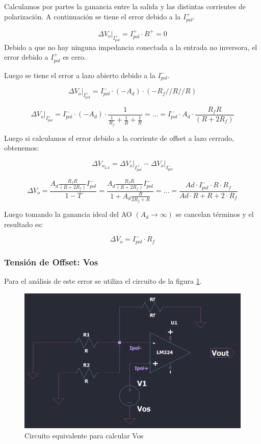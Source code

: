 \vspace{1em}
Calculamos por partes la ganancia entre la salida y las distintas corrientes de polarización. A continuación se tiene el error debido a la $I_{pol}^{+}$.

\[
\left.\Delta V_{o} \right|_{I_{p o l}^{+}}= I_{p o l}^{+} \cdot R^{+} = 0
\]
Debido a que no hay ninguna impedancia conectada a la entrada no inversora, el error debido a  $I_{pol}^{+}$ es cero.

\vspace{1em}

Luego se tiene el error a lazo abierto debido a la $I_{pol}^{-}$.
 
\[
\left.\Delta V_{o} \right|_{I_{pol}^{+}} = I_{pol}^{-} \cdot (-A_d) \cdot (-R_f // R // R)
\] 

\[\left.\Delta V_{o} \right|_{I_{pol}^{+}} 
= I_{pol}^{-} \cdot (-A_d) \cdot \frac{1}{\frac{1}{R_f}+\frac{1}{R}+\frac{1}{R}} 
= ... = I_{pol}^{-} \cdot A_d \cdot \frac{R_f R}{(R+2 R_f)} \] 
 
Luego si calculamos el error debido a la corriente de offset a lazo cerrado, obtenemos:

 \[ \Delta V_{o_{LA}} = \left.\Delta V_{o} \right|_{I_{pol}^{+}} - \left.\Delta V_{o} \right|_{I_{pol}^{-}}  \] 



\[
\Delta V_{o}= \frac{A_d \frac{R_f R}{(R+2 R_f)} I_{pol}^{-}}{1 - T} 
= \frac{A_d \frac{R_f R}{(R+2 R_f)} I_{pol}^{-}}{1 + A_d \frac{R}{2 R_f+R}} 
= ... =  \frac{Ad \cdot  I_{pol}^{-} \cdot R \cdot R_f}{Ad \cdot R + R + 2 \cdot R_f} 
\] 

Luego  tomando la ganancia ideal del AO $\left(A_{d} \rightarrow \infty\right)$ se cancelan términos y el resultado es:

\[
\Delta V_{o} 
= I_{pol}^{-} \cdot R_f
\]


\subsubsection{Tensión de Offset: Vos}
 
Para el análisis de este error se utiliza el circuito de la figura \ref{fig:equivalentevos}. 


\begin{figure}[h!]
    \centering
    \includegraphics[width=0.90\linewidth]{img/equivalente_vos.png}
    \caption{Circuito equivalente para calcular Vos}
    \label{fig:equivalentevos}
\end{figure}


